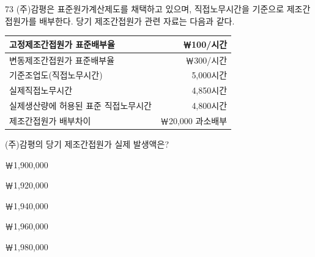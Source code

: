 \begin{question}{73}
(주)감평은 표준원가계산제도를 채택하고 있으며, 직접노무시간을 기준으로 제조간접원가를 배부한다. 당기 제조간접원가 관련 자료는 다음과 같다.
\par{\small\centering\begin{tabular}{|l|r|}\hline
고정제조간접원가 표준배부율 & ￦100/시간 \\ \hline
변동제조간접원가 표준배부율 & ￦300/시간 \\ \hline
기준조업도(직접노무시간) & 5,000시간 \\ \hline
실제직접노무시간 & 4,850시간 \\ \hline
실제생산량에 허용된 표준 직접노무시간 & 4,800시간 \\ \hline
제조간접원가 배부차이 & ￦20,000 과소배부 \\ \hline
\end{tabular}\par}
(주)감평의 당기 제조간접원가 실제 발생액은?
\begin{choices}
  \item ￦1,900,000
  \item ￦1,920,000
  \item ￦1,940,000
  \item ￦1,960,000
  \item ￦1,980,000
\end{choices}
\end{question}
